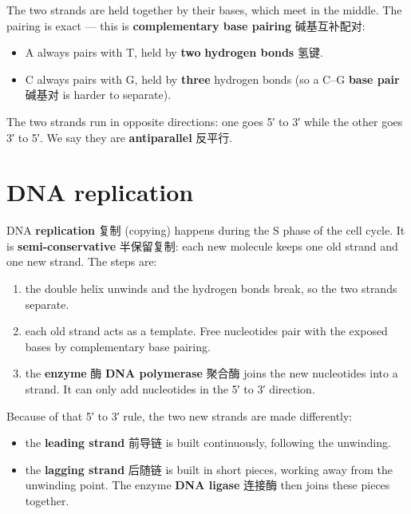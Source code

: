 \documentclass[11pt]{article}
\begin{document}
The two strands are held together by their bases, which meet in the middle. The pairing is exact — this is \textbf{complementary base pairing} 碱基互补配对:

\begin{itemize}
\item A always pairs with T, held by \textbf{two} \textbf{hydrogen bonds} 氢键.

\item C always pairs with G, held by \textbf{three} hydrogen bonds (so a C–G \textbf{base pair} 碱基对 is harder to separate).

\end{itemize}

The two strands run in opposite directions: one goes 5′ to 3′ while the other goes 3′ to 5′. We say they are \textbf{antiparallel} 反平行.

\section*{DNA replication}

DNA \textbf{replication} 复制 (copying) happens during the S phase of the cell cycle. It is \textbf{semi-conservative} 半保留复制: each new molecule keeps one old strand and one new strand. The steps are:

\begin{enumerate}
\item the double helix unwinds and the hydrogen bonds break, so the two strands separate.

\item each old strand acts as a template. Free nucleotides pair with the exposed bases by complementary base pairing.

\item the \textbf{enzyme} 酶 \textbf{DNA polymerase} 聚合酶 joins the new nucleotides into a strand. It can only add nucleotides in the 5′ to 3′ direction.

\end{enumerate}

Because of that 5′ to 3′ rule, the two new strands are made differently:

\begin{itemize}
\item the \textbf{leading strand} 前导链 is built continuously, following the unwinding.

\item the \textbf{lagging strand} 后随链 is built in short pieces, working away from the unwinding point. The enzyme \textbf{DNA ligase} 连接酶 then joins these pieces together.

\end{itemize}
\end{document}
